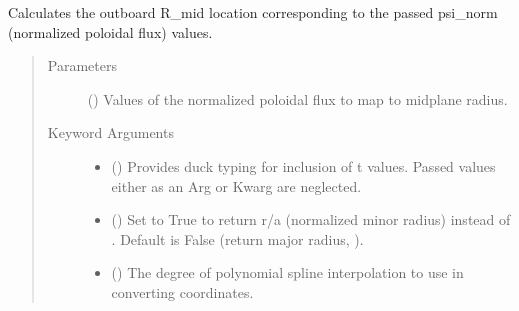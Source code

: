 \documentclass[letterpaper,10pt,english]{sphinxmanual}
\begin{document}
\begin{fulllineitems}
\begin{fulllineitems}
\begin{sphinxVerbatim}[commandchars=\\\{\}]
    
\end{sphinxVerbatim}

\end{fulllineitems}


\begin{fulllineitems}
\label{\detokenize{eqtools:eqtools.eqdskreader.EqdskReader.psinorm2rmid}}
Calculates the outboard R\_mid location corresponding to the passed
psi\_norm (normalized poloidal flux) values.
\begin{quote}\begin{description}
\item[{Parameters}] \leavevmode
{} () \textendash{} Values of the normalized
poloidal flux to map to midplane radius.

\item[{Keyword Arguments}] \leavevmode\begin{itemize}
\item {} 
 () \textendash{} Provides duck typing for inclusion of t values.
Passed  values either as an Arg or Kwarg are neglected.

\item {} 
 () \textendash{} Set to True to return r/a (normalized minor radius)
instead of . Default is False (return major radius,
).

\item {} 
 () \textendash{} The degree of polynomial spline interpolation to
use in converting coordinates.


\end{itemize}
\end{description}
\end{quote}
\end{fulllineitems}
\end{fulllineitems}
\end{document}
